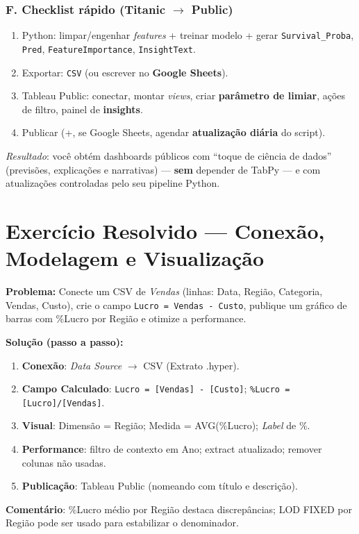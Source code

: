 \subsubsection*{F. Checklist rápido (Titanic \texorpdfstring{$\rightarrow$}{->} Public)}
\begin{enumerate}[leftmargin=*]
\item Python: limpar/engenhar \emph{features} + treinar modelo + gerar \texttt{Survival_Proba}, \texttt{Pred}, \texttt{FeatureImportance}, \texttt{InsightText}.
\item Exportar: \texttt{CSV} (ou escrever no \textbf{Google Sheets}).
\item Tableau Public: conectar, montar \emph{views}, criar \textbf{parâmetro de limiar}, ações de filtro, painel de \textbf{insights}.
\item Publicar (+, se Google Sheets, agendar \textbf{atualização diária} do script).
\end{enumerate}

\noindent\emph{Resultado}: você obtém dashboards públicos com “toque de ciência de dados” (previsões, explicações e narrativas) — \textbf{sem} depender de TabPy — e com atualizações controladas pelo seu pipeline Python.


\section{Exercício Resolvido — Conexão, Modelagem e Visualização }
\begin{SolvedBox}
\textbf{Problema:} Conecte um CSV de \textit{Vendas} (linhas: Data, Região, Categoria, Vendas, Custo), crie o campo \texttt{Lucro = Vendas - Custo}, publique um gráfico de barras com \%Lucro por Região e otimize a performance.

\textbf{Solução (passo a passo):}
\begin{enumerate}[leftmargin=*]
  \item \textbf{Conexão}: \textit{Data Source} $\rightarrow$ CSV (Extrato .hyper).
  \item \textbf{Campo Calculado}: \texttt{Lucro = [Vendas] - [Custo]}; \texttt{\%Lucro = [Lucro]/[Vendas]}.
  \item \textbf{Visual}: Dimensão = Região; Medida = AVG(\%Lucro); \textit{Label} de \%.
  \item \textbf{Performance}: filtro de contexto em Ano; extract atualizado; remover colunas não usadas.
  \item \textbf{Publicação}: Tableau Public (nomeando com título e descrição).
\end{enumerate}
\textbf{Comentário}: \%Lucro médio por Região destaca discrepâncias; LOD FIXED por Região pode ser usado para estabilizar o denominador.
\end{SolvedBox}




